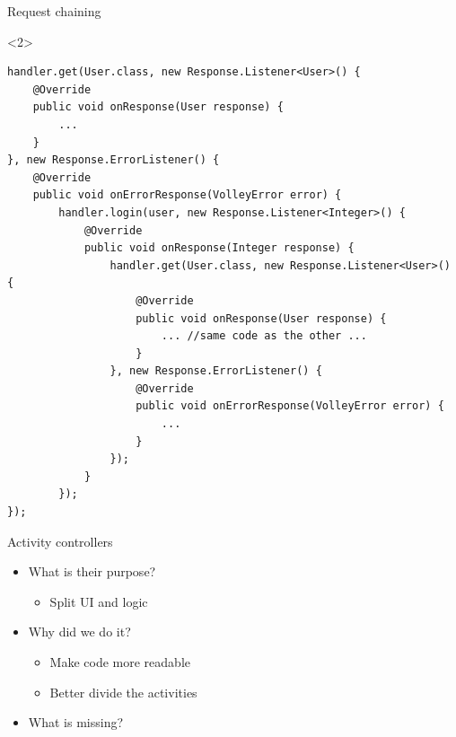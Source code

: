 \begin{frame}[fragile]{Request chaining}
\begin{onlyenv}<2>
\begin{center}
\begin{minipage}[H]{0.9\linewidth}
\begin{lstlisting}    
handler.get(User.class, new Response.Listener<User>() {
	@Override
    public void onResponse(User response) {
    	... 
    }
}, new Response.ErrorListener() {
	@Override
    public void onErrorResponse(VolleyError error) {
    	handler.login(user, new Response.Listener<Integer>() {
        	@Override
            public void onResponse(Integer response) {
            	handler.get(User.class, new Response.Listener<User>() {
                	@Override
                    public void onResponse(User response) {
                    	... //same code as the other ...
                    }
                }, new Response.ErrorListener() {
                    @Override
                    public void onErrorResponse(VolleyError error) {
						...
                    }
                });
            }
        });
});
\end{lstlisting} 
\end{minipage}
\end{center}
\end{onlyenv}
\end{frame}

\begin{frame}{Activity controllers}
\begin{itemize}
  \item What is their purpose?
  \begin{itemize}
  \item Split UI and logic
\end{itemize}
  \item Why did we do it?
  \begin{itemize}
  \item Make code more readable
  \item Better divide the activities
\end{itemize}
  \item What is missing?
\end{itemize}
\end{frame}

